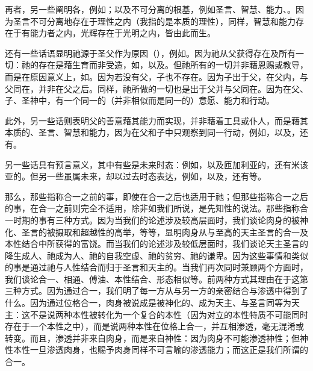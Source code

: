 再者，另一些阐明各，例如；以及不可分离的根基，例如圣言、智慧、能力、。因为圣言不可分离地存在于理性之内（我指的是本质的理性），同样，智慧和能力存在于有能力者之内，光辉存在于光明之内，皆由此而生。\par

还有一些话语显明祂源于圣父作为原因（），例如。因为祂从父获得存在及所有一切：祂的存在是藉生育而非受造，如，以及。但祂所有的一切并非藉恩赐或教导，而是在原因意义上，如。因为若没有父，子也不存在。因为子出于父，在父内，与父同在，并非在父之后。同样，祂所做的一切也是出于父并与父同在。因为在父、子、圣神中，有一个同一的（并非相似而是同一的）意愿、能力和行动。\par

此外，另一些话则表明父的善意藉其能力而实现，并非藉着工具或仆人，而是藉其本质的、圣言、智慧和能力，因为在父和子中只观察到同一行动，例如，以及，还有。\par

另一些话具有预言意义，其中有些是未来时态：例如，以及匝加利亚的，还有米该亚的。但另一些虽属未来，却以过去时态表达，例如，以及，还有等。\par

那么，那些指称合一之前的事，即使在合一之后也适用于祂；但那些指称合一之后的事，在合一之前则完全不适用，除非如我们所说，是先知性的说法。那些指称合一时期的事有三种方式。因为当我们的论述涉及较高层面时，我们谈论肉身的被神化、圣言的被摄取和超越性的高举，等等，显明肉身从与至高的天主圣言的合一及本性结合中所获得的富饶。而当我们的论述涉及较低层面时，我们谈论天主圣言的降生成人、祂成为人、祂的自我空虚、祂的贫穷、祂的谦卑。因为这些事情和类似的事是通过祂与人性结合而归于圣言和天主的。当我们再次同时兼顾两个方面时，我们谈论合一、相通、傅油、本性结合、形态相似等。前两种方式其理由在于这第三种方式。因为通过合一，我们明了每一方从与另一方的亲密结合与渗透中得到了什么。因为通过位格合一，肉身被说成是被神化的、成为天主、与圣言同等为天主：这不是说两种本性被转化为一个复合的本性（因为对立的本性特质不可能同时存在于一个本性之中），而是说两种本性在位格上合一，并互相渗透，毫无混淆或转变。而且，渗透并非来自肉身，而是来自神性：因为肉身不可能渗透神性；但神性本性一旦渗透肉身，也赐予肉身同样不可言喻的渗透能力；而这正是我们所谓的合一。\par


